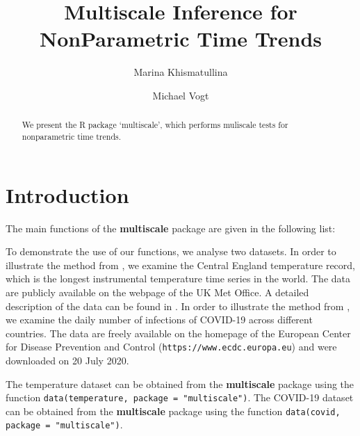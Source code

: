 \documentclass[a4paper]{scrartcl}
\title{Multiscale Inference for NonParametric Time Trends}
\author{Marina Khismatullina \and Michael Vogt}
\begin{document}


\maketitle

\begin{abstract}
We present the R package `multiscale', which performs muliscale tests for nonparametric time trends.
\end{abstract}

\tableofcontents

\section{Introduction}
The main functions of the \textbf{multiscale} package are given in
the following list:

To demonstrate the use of our functions, we analyse two datasets. In order to illustrate the method from \cite{KhismatullinaVogt2020a}, we examine the Central England temperature record, which is the longest instrumental temperature time series in the world. The data are publicly available on the webpage of the UK Met Office. A detailed description of the data can be found in \cite{Parker1992}. In order to illustrate the method from \cite{KhismatullinaVogt2020b}, we examine the daily number of infections of COVID-19 across different countries. The data are freely available on the homepage of the European Center for Disease Prevention and Control (\texttt{https://www.ecdc.europa.eu}) and were downloaded on 20 July 2020.

The temperature dataset can be obtained from the \textbf{multiscale} package using the function \verb|data(temperature, package = "multiscale")|. The COVID-19 dataset can be obtained from the \textbf{multiscale} package using the function \linebreak \verb|data(covid, package = "multiscale")|.
\end{document}
